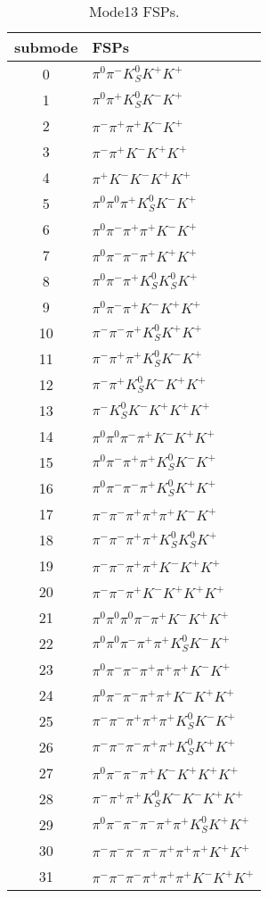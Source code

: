 \begin{table}[h!]
\begin{center}
\begin{tabular}{cl}
\hline
submode& FSPs\\
\hline
0 & $\pi^0 \pi^- K_S^0 K^+ K^+ $ \\
1 & $\pi^0 \pi^+ K_S^0 K^- K^+ $ \\
2 & $\pi^- \pi^+ \pi^+ K^- K^+ $ \\
3 & $\pi^- \pi^+ K^- K^+ K^+ $ \\
4 & $\pi^+ K^- K^- K^+ K^+ $ \\
5 & $\pi^0 \pi^0 \pi^+ K_S^0 K^- K^+ $ \\
6 & $\pi^0 \pi^- \pi^+ \pi^+ K^- K^+ $ \\
7 & $\pi^0 \pi^- \pi^- \pi^+ K^+ K^+ $ \\
8 & $\pi^0 \pi^- \pi^+ K_S^0 K_S^0 K^+ $ \\
9 & $\pi^0 \pi^- \pi^+ K^- K^+ K^+ $ \\
10 & $\pi^- \pi^- \pi^+ K_S^0 K^+ K^+ $ \\
11 & $\pi^- \pi^+ \pi^+ K_S^0 K^- K^+ $ \\
12 & $\pi^- \pi^+ K_S^0 K^- K^+ K^+ $ \\
13 & $\pi^- K_S^0 K^- K^+ K^+ K^+ $ \\
14 & $\pi^0 \pi^0 \pi^- \pi^+ K^- K^+ K^+ $ \\
15 & $\pi^0 \pi^- \pi^+ \pi^+ K_S^0 K^- K^+ $ \\
16 & $\pi^0 \pi^- \pi^- \pi^+ K_S^0 K^+ K^+ $ \\
17 & $\pi^- \pi^- \pi^+ \pi^+ \pi^+ K^- K^+ $ \\
18 & $\pi^- \pi^- \pi^+ \pi^+ K_S^0 K_S^0 K^+ $ \\
19 & $\pi^- \pi^- \pi^+ \pi^+ K^- K^+ K^+ $ \\
20 & $\pi^- \pi^- \pi^+ K^- K^+ K^+ K^+ $ \\
21 & $\pi^0 \pi^0 \pi^0 \pi^- \pi^+ K^- K^+ K^+ $ \\
22 & $\pi^0 \pi^0 \pi^- \pi^+ \pi^+ K_S^0 K^- K^+ $ \\
23 & $\pi^0 \pi^- \pi^- \pi^+ \pi^+ \pi^+ K^- K^+ $ \\
24 & $\pi^0 \pi^- \pi^- \pi^+ \pi^+ K^- K^+ K^+ $ \\
25 & $\pi^- \pi^- \pi^+ \pi^+ \pi^+ K_S^0 K^- K^+ $ \\
26 & $\pi^- \pi^- \pi^- \pi^+ \pi^+ K_S^0 K^+ K^+ $ \\
27 & $\pi^0 \pi^- \pi^- \pi^+ K^- K^+ K^+ K^+ $ \\
28 & $\pi^- \pi^+ \pi^+ K_S^0 K^- K^- K^+ K^+ $ \\
29 & $\pi^0 \pi^- \pi^- \pi^- \pi^+ \pi^+ K_S^0 K^+ K^+ $ \\
30 & $\pi^- \pi^- \pi^- \pi^- \pi^+ \pi^+ \pi^+ K^+ K^+ $ \\
31 & $\pi^- \pi^- \pi^- \pi^+ \pi^+ \pi^+ K^- K^+ K^+ $ \\
\hline
\end{tabular}
\label{tab:Mode13FSPs}
\caption{Mode13 FSPs.}
\end{center}
\end{table}
